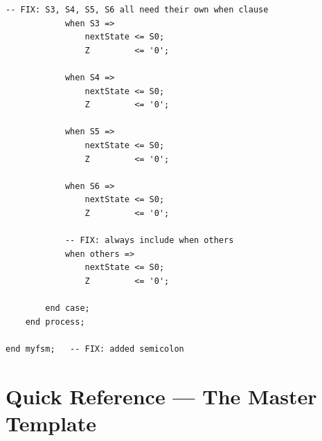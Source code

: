 \documentclass[12pt,a4paper]{article}
\begin{document}
\begin{tcolorbox}[vhdlbox, title={fsm.vhd --- Corrected}]
\begin{lstlisting}[style=vhdlstyle]
            -- FIX: S3, S4, S5, S6 all need their own when clause
            when S3 =>
                nextState <= S0;
                Z         <= '0';

            when S4 =>
                nextState <= S0;
                Z         <= '0';

            when S5 =>
                nextState <= S0;
                Z         <= '0';

            when S6 =>
                nextState <= S0;
                Z         <= '0';

            -- FIX: always include when others
            when others =>
                nextState <= S0;
                Z         <= '0';

        end case;
    end process;

end myfsm;   -- FIX: added semicolon
\end{lstlisting}
\end{tcolorbox}

\newpage

\section{Quick Reference --- The Master Template}
\end{document}
